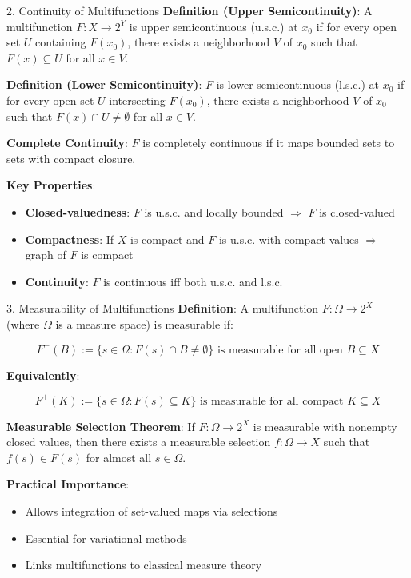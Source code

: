 \documentclass[aspectratio=169,10pt]{beamer}
\begin{document}
\begin{frame}[allowframebreaks]{2. Continuity of Multifunctions}
    \textbf{Definition (Upper Semicontinuity)}:
    A multifunction $F: X \to 2^Y$ is upper semicontinuous (u.s.c.) at $x_0$ if for every open set $U$ containing $F(x_0)$, there exists a neighborhood $V$ of $x_0$ such that $F(x) \subseteq U$ for all $x \in V$.

    \vspace{0.4cm}
    \textbf{Definition (Lower Semicontinuity)}:
    $F$ is lower semicontinuous (l.s.c.) at $x_0$ if for every open set $U$ intersecting $F(x_0)$, there exists a neighborhood $V$ of $x_0$ such that $F(x) \cap U \neq \emptyset$ for all $x \in V$.

    \vspace{0.4cm}
    \textbf{Complete Continuity}:
    $F$ is completely continuous if it maps bounded sets to sets with compact closure.

    \vspace{0.4cm}
    \textbf{Key Properties}:
    \begin{itemize}
        \item \textbf{Closed-valuedness}: $F$ is u.s.c. and locally bounded $\Rightarrow$ $F$ is closed-valued
        \item \textbf{Compactness}: If $X$ is compact and $F$ is u.s.c. with compact values $\Rightarrow$ graph of $F$ is compact
        \item \textbf{Continuity}: $F$ is continuous iff both u.s.c. and l.s.c.
    \end{itemize}
\end{frame}

\begin{frame}[allowframebreaks]{3. Measurability of Multifunctions}
    \textbf{Definition}: A multifunction $F: \Omega \to 2^X$ (where $\Omega$ is a measure space) is measurable if:

    $$F^{-}(B) := \{s \in \Omega : F(s) \cap B \neq \emptyset\} \text{ is measurable for all open } B \subseteq X$$

    \vspace{0.4cm}
    \textbf{Equivalently}:

    $$F^{+}(K) := \{s \in \Omega : F(s) \subseteq K\} \text{ is measurable for all compact } K \subseteq X$$

    \vspace{0.4cm}
    \textbf{Measurable Selection Theorem}:
    If $F: \Omega \to 2^X$ is measurable with nonempty closed values, then there exists a measurable selection $f: \Omega \to X$ such that $f(s) \in F(s)$ for almost all $s \in \Omega$.

    \vspace{0.4cm}
    \textbf{Practical Importance}:
    \begin{itemize}
        \item Allows integration of set-valued maps via selections
        \item Essential for variational methods
        \item Links multifunctions to classical measure theory
    \end{itemize}
\end{frame}
\end{document}
